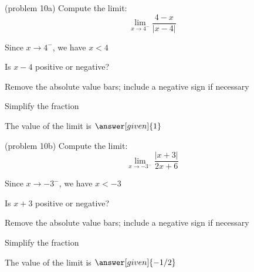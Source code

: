 \documentclass{ximera}
\begin{document}
\begin{problem}(problem 10a)
  Compute the limit:
  \[
  \lim_{x \to 4^-} \frac{4-x}{|x-4|}
  \]
  
    \begin{hint}
      Since $x \to 4^-$, we have $x<4$
    \end{hint}
    \begin{hint}
      Is $x-4$ positive or negative?
    \end{hint}
    \begin{hint}
      Remove the absolute value bars; include a negative sign if necessary
    \end{hint}
		\begin{hint}
      Simplify the fraction
    \end{hint}
		The value of the limit is
		 $\answer[given]{1}$
		
\end{problem}


\begin{problem}(problem 10b)
  Compute the limit:
  \[
  \lim_{x \to -3^-} \frac{|x+3|}{2x+6}
  \]
  
    \begin{hint}
      Since $x \to -3^-$, we have $x<-3$
    \end{hint}
    \begin{hint}
      Is $x+3$ positive or negative?
    \end{hint}
    \begin{hint}
      Remove the absolute value bars; include a negative sign if necessary
    \end{hint}
		\begin{hint}
      Simplify the fraction
    \end{hint}
		The value of the limit is
		 $\answer[given]{-1/2}$
		
\end{problem}


\begin{center}
\begin{foldable}
\end{foldable}
\end{center}
\end{document}

